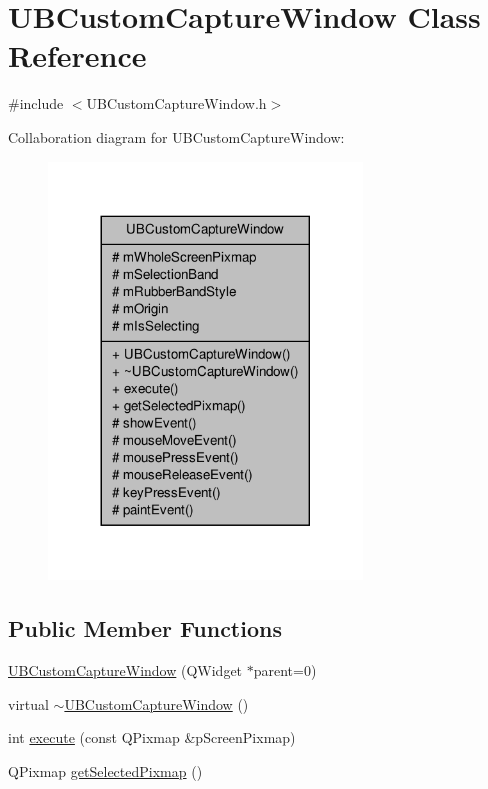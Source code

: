 \hypertarget{class_u_b_custom_capture_window}{\section{U\-B\-Custom\-Capture\-Window Class Reference}
\label{d1/d5d/class_u_b_custom_capture_window}
}


{\ttfamily \#include $<$U\-B\-Custom\-Capture\-Window.\-h$>$}



Collaboration diagram for U\-B\-Custom\-Capture\-Window\-:
\nopagebreak
\begin{figure}[H]
\begin{center}
\leavevmode
\includegraphics[width=236pt]{d7/d8b/class_u_b_custom_capture_window__coll__graph}
\end{center}
\end{figure}
\subsection*{Public Member Functions}
\begin{DoxyCompactItemize}
\item 
\hyperlink{class_u_b_custom_capture_window_a730b16ee07f9bfdf54bbf41415672563}{U\-B\-Custom\-Capture\-Window} (Q\-Widget $\ast$parent=0)
\item 
virtual \hyperlink{class_u_b_custom_capture_window_a90c0067e95a06fcd308c8377f466f799}{$\sim$\-U\-B\-Custom\-Capture\-Window} ()
\item 
int \hyperlink{class_u_b_custom_capture_window_a5a46205859c969a802ce8df4105b7934}{execute} (const Q\-Pixmap \&p\-Screen\-Pixmap)
\item 
Q\-Pixmap \hyperlink{class_u_b_custom_capture_window_af1a5085a72638542a35473065de585e9}{get\-Selected\-Pixmap} ()
\end{DoxyCompactItemize}
